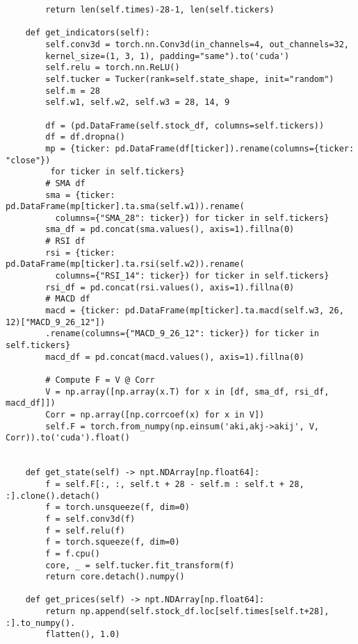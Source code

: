 \begin{verbatim}
        return len(self.times)-28-1, len(self.tickers)

    def get_indicators(self):
        self.conv3d = torch.nn.Conv3d(in_channels=4, out_channels=32,
        kernel_size=(1, 3, 1), padding="same").to('cuda')
        self.relu = torch.nn.ReLU()
        self.tucker = Tucker(rank=self.state_shape, init="random")
        self.m = 28
        self.w1, self.w2, self.w3 = 28, 14, 9
        
        df = (pd.DataFrame(self.stock_df, columns=self.tickers))
        df = df.dropna()
        mp = {ticker: pd.DataFrame(df[ticker]).rename(columns={ticker: "close"})
         for ticker in self.tickers}
        # SMA df
        sma = {ticker: pd.DataFrame(mp[ticker].ta.sma(self.w1)).rename(
          columns={"SMA_28": ticker}) for ticker in self.tickers}
        sma_df = pd.concat(sma.values(), axis=1).fillna(0)
        # RSI df
        rsi = {ticker: pd.DataFrame(mp[ticker].ta.rsi(self.w2)).rename(
          columns={"RSI_14": ticker}) for ticker in self.tickers}
        rsi_df = pd.concat(rsi.values(), axis=1).fillna(0)
        # MACD df
        macd = {ticker: pd.DataFrame(mp[ticker].ta.macd(self.w3, 26, 12)["MACD_9_26_12"])
        .rename(columns={"MACD_9_26_12": ticker}) for ticker in self.tickers}
        macd_df = pd.concat(macd.values(), axis=1).fillna(0)

        # Compute F = V @ Corr
        V = np.array([np.array(x.T) for x in [df, sma_df, rsi_df, macd_df]])
        Corr = np.array([np.corrcoef(x) for x in V])
        self.F = torch.from_numpy(np.einsum('aki,akj->akij', V, Corr)).to('cuda').float()


    def get_state(self) -> npt.NDArray[np.float64]:
        f = self.F[:, :, self.t + 28 - self.m : self.t + 28, :].clone().detach()      
        f = torch.unsqueeze(f, dim=0) 
        f = self.conv3d(f)
        f = self.relu(f)
        f = torch.squeeze(f, dim=0)
        f = f.cpu()
        core, _ = self.tucker.fit_transform(f)
        return core.detach().numpy()

    def get_prices(self) -> npt.NDArray[np.float64]:
        return np.append(self.stock_df.loc[self.times[self.t+28], :].to_numpy().
        flatten(), 1.0)
    
\end{verbatim}

